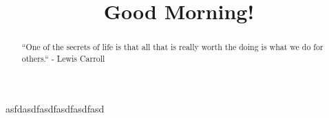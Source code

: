 \documentclass{ximera}
\title{Good Morning!}
\begin{document}
\begin{abstract}
``One of the secrets of life is that all that is really worth the doing is what we do for others.`` - Lewis Carroll
\end{abstract}

\maketitle

asfdasdfasdfasdfasdfasd
\end{document}
